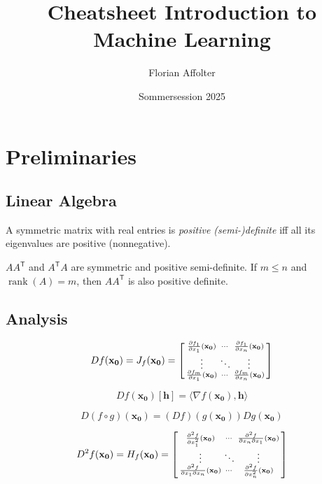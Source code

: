 \documentclass[a4paper,11pt]{article}
\title{Cheatsheet Introduction to Machine Learning}
\author{Florian Affolter}
\date{Sommersession 2025}
\def\T{\mathsf{T}}
\begin{document}

\section*{Preliminaries}
\subsection*{Linear Algebra}

A symmetric matrix with real entries is \emph{positive (semi-)definite} iff all its eigenvalues are positive (nonnegative).

\( A A^\T \) and \( A^\T A \) are symmetric and positive semi-definite. If \( m \leq n \) and \( \operatorname{rank}(A) = m \), then \( A A^\T \) is also positive definite.


\subsection*{Analysis}

\[
        D f(\mathbf{x_0}) = J_f(\mathbf{x_0}) \\= \begin{bsmallmatrix}
        \frac{\partial f_1}{\partial x_1}(\mathbf{x_0}) & \cdots & \frac{\partial f_1}{\partial x_n}(\mathbf{x_0}) \\
        \vdots & \ddots & \vdots \\
        \frac{\partial f_m}{\partial x_1}(\mathbf{x_0}) & \cdots & \frac{\partial f_m}{\partial x_n}(\mathbf{x_0})
    \end{bsmallmatrix}
\]

\[
    D f(\mathbf{x_0})[\mathbf{h}] = \langle \nabla f(\mathbf{x_0}), \mathbf{h} \rangle
\]

\[
    D (f \circ g)(\mathbf{x_0}) = (D f)(g(\mathbf{x_0})) D g(\mathbf{x_0})
\]

\[
    D^2 f(\mathbf{x_0}) = H_f(\mathbf{x_0}) \\= \begin{bsmallmatrix}
        \frac{\partial^2 f}{\partial x_1^2}(\mathbf{x_0}) & \cdots & \frac{\partial^2 f}{\partial x_n \partial x_1}(\mathbf{x_0}) \\
        \vdots & \ddots & \vdots \\
        \frac{\partial^2 f}{\partial x_1 \partial x_n}(\mathbf{x_0}) & \cdots & \frac{\partial^2 f}{\partial x_n^2}(\mathbf{x_0})
    \end{bsmallmatrix}
\]
\end{document}
